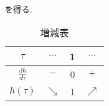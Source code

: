 を得る.
\begin{table}[bhtp]
\caption{増減表}
\label{tab:zougenhyo}
\centering
\begin{tabular}{c|ccc}
$\tau$&$\cdots$&1&$\cdots$\\
\hline
$\frac{dh}{d\tau}$&$-$&0&$+$\\
$h(\tau)$&$\searrow$&1&$\nearrow$
\end{tabular}
\end{table}
\begin{figure}[htbp]
  \begin{minipage}{0.5\hsize}
  \end{minipage}
  \begin{minipage}{0.5\hsize}
  \end{minipage}
\end{figure}
\newpage
